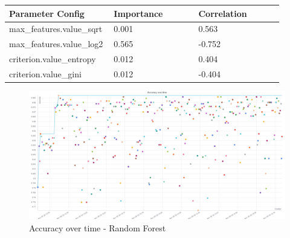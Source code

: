 \documentclass[11pt]{article}
\begin{document}
\begin{appendices}
  \begin{table}[ht]
    \centering
    \begin{tabular}{|p{0.3\linewidth} | p{0.3\linewidth}| p{0.3\linewidth}|} 
      \hline
      \textbf{Parameter Config}  & \textbf{Importance} & \textbf{Correlation} \\ \hline
      max\_features.value\_sqrt & 0.001 & 0.563 \\ \hline
      max\_features.value\_log2 & 0.565 & -0.752 \\ \hline
      criterion.value\_entropy & 0.012 & 0.404 \\ \hline
      criterion.value\_gini & 0.012 & -0.404 \\ \hline
    \end{tabular}
  \end{table}\label{RF_ParamImp2}

\begin{figure}
    \caption {Accuracy over time - Random Forest} \label{RFAccOverTime}
    \centering
    \includegraphics[width = \textwidth, height = \textwidth, keepaspectratio]{Images/RF Acc over time.png}
\end{figure}


\end{appendices}
\end{document}
